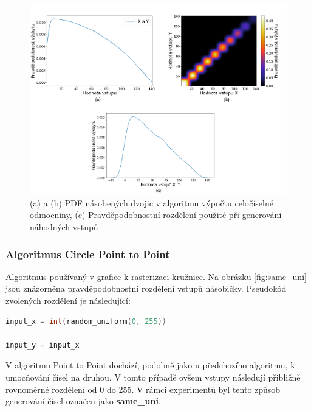 \begin{figure}[H]
    \centering
    \includegraphics[width=\textwidth]{obrazky-figures/same_triang_all.png}
    \caption{(a) a (b) PDF násobených dvojic v algoritmu výpočtu celočíselné odmocniny, (c) Pravděpodobnostní rozdělení použité při generování náhodných vstupů}
    \label{fig:same_triang}
\end{figure}

\pagebreak

\subsubsection{Algoritmus Circle Point to Point}
Algoritmus používaný v grafice k rasterizaci kružnice. Na obrázku \ref{fig:same_uni} jsou znázorněna pravděpodobnostní rozdělení vstupů násobičky. Pseudokód zvolených rozdělení je následující:

\begin{lstlisting}[language={C}, label={lst:circle}]
input_x = int(random_uniform(0, 255))

input_y = input_x
\end{lstlisting}

V algoritmu Point to Point dochází, podobně jako u předchozího algoritmu, k umocňování čísel na druhou. V tomto případě ovšem vstupy následují přibližně rovnoměrné rozdělení od 0 do 255. V rámci experimentů byl tento způsob generování čísel označen jako \textbf{same\_uni}.

